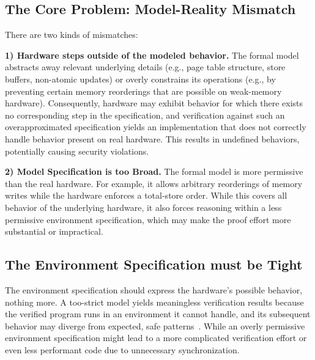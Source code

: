 \subsection{The Core Problem: Model-Reality Mismatch}

There are two kinds of mismatches:

\noindent\textbf{1) Hardware steps outside of the modeled behavior.}
The formal model abstracts away relevant underlying details (e.g., page table structure, store buffers, non-atomic updates) or overly constrains its operations (e.g., by preventing certain memory reorderings that are possible on weak-memory hardware).
Consequently, hardware may exhibit behavior for which there exists no corresponding step in the specification, and verification against such an overapproximated specification yields an implementation that does not correctly handle behavior present on real hardware. This results in undefined behaviors, potentially causing security violations.

\noindent\textbf{2) Model Specification is too Broad.}
The formal model is more permissive than the real hardware. For example, it allows arbitrary reorderings of memory writes while the hardware enforces a total-store order. 
While this covers all behavior of the underlying hardware, it also forces reasoning within a less permissive environment specification, which may make the proof effort more substantial or impractical.


\subsection{The Environment Specification must be Tight}

The environment specification should express the hardware's possible behavior, nothing more.
A too-strict model yields meaningless verification results because the verified program runs in an environment it cannot handle, and its subsequent behavior may diverge from expected, safe patterns~\cite{goldweber2024ironspec, reid2016trustworthy}. 
While an overly permissive environment specification might lead to a more complicated verification effort or even less performant code due to unnecessary synchronization.


